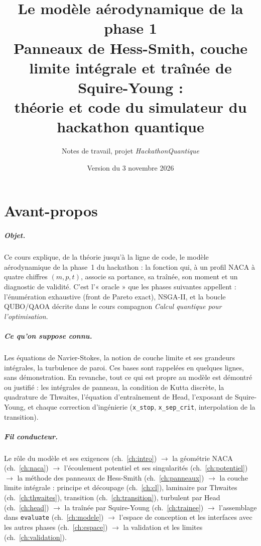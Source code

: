 \documentclass[11pt,a4paper]{report}
\title{\textbf{Le modèle aérodynamique de la phase 1}\\[0.4em]\large Panneaux de Hess-Smith, couche limite intégrale et traînée de Squire-Young :\\ théorie et code du simulateur du hackathon quantique}
\author{Notes de travail, projet \emph{HackathonQuantique}}
\date{Version du 3 novembre 2026}
\newcommand{\code}[1]{\texttt{#1}}
\begin{document}
\maketitle
{}

\chapter*{Avant-propos}
\paragraph{Objet.} Ce cours explique, de la théorie jusqu'à la ligne de code, le modèle aérodynamique de la phase~1 du hackathon : la fonction qui, à un profil NACA à quatre chiffres $(m,p,t)$, associe sa portance, sa traînée, son moment et un diagnostic de validité. C'est l'« oracle » que les phases suivantes appellent : l'énumération exhaustive (front de Pareto exact), NSGA-II, et la boucle QUBO/QAOA décrite dans le cours compagnon \emph{Calcul quantique pour l'optimisation}.

\paragraph{Ce qu'on suppose connu.} Les équations de Navier-Stokes, la notion de couche limite et ses grandeurs intégrales, la turbulence de paroi. Ces bases sont rappelées en quelques lignes, sans démonstration. En revanche, tout ce qui est propre au modèle est démontré ou justifié : les intégrales de panneau, la condition de Kutta discrète, la quadrature de Thwaites, l'équation d'entraînement de Head, l'exposant de Squire-Young, et chaque correction d'ingénierie (\code{x\_stop}, \code{x\_sep\_crit}, interpolation de la transition).

\paragraph{Fil conducteur.} Le rôle du modèle et ses exigences (ch.~\ref{ch:intro}) $\to$ la géométrie NACA (ch.~\ref{ch:naca}) $\to$ l'écoulement potentiel et ses singularités (ch.~\ref{ch:potentiel}) $\to$ la méthode des panneaux de Hess-Smith (ch.~\ref{ch:panneaux}) $\to$ la couche limite intégrale : principe et découpage (ch.~\ref{ch:cl}), laminaire par Thwaites (ch.~\ref{ch:thwaites}), transition (ch.~\ref{ch:transition}), turbulent par Head (ch.~\ref{ch:head}) $\to$ la traînée par Squire-Young (ch.~\ref{ch:trainee}) $\to$ l'assemblage dans \code{evaluate} (ch.~\ref{ch:modele}) $\to$ l'espace de conception et les interfaces avec les autres phases (ch.~\ref{ch:espace}) $\to$ la validation et les limites (ch.~\ref{ch:validation}).
\end{document}
